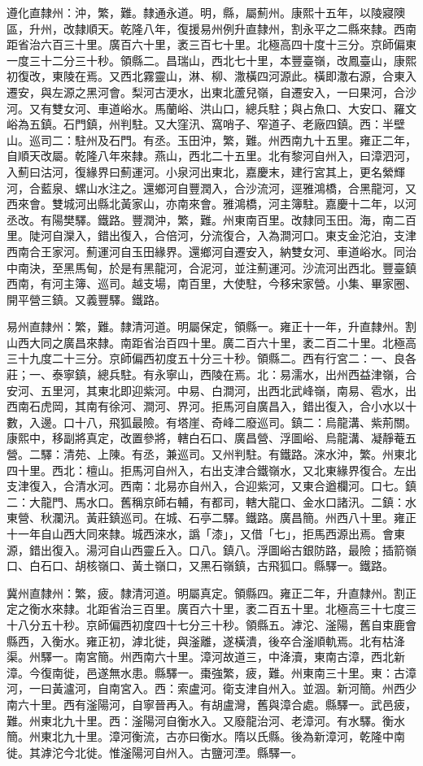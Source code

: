 \begin{pinyinscope}
遵化直隸州：沖，繁，難。隸通永道。明，縣，屬薊州。康熙十五年，以陵寢隩區，升州，改隸順天。乾隆八年，復援易州例升直隸州，割永平之二縣來隸。西南距省治六百三十里。廣百六十里，袤三百七十里。北極高四十度十三分。京師偏東一度三十二分三十秒。領縣二。昌瑞山，西北七十里，本豐臺嶺，改鳳臺山，康熙初復改，東陵在焉。又西北霧靈山，淋、柳、潵橫四河源此。橫即潵右源，合東入遷安，與左源之黑河會。梨河古浭水，出東北蘆兒嶺，自遷安入，一曰果河，合沙河。又有雙女河、車道峪水。馬蘭峪、洪山口，總兵駐；與占魚口、大安口、羅文峪為五鎮。石門鎮，州判駐。又大窪汛、窩哨子、窄道子、老廠四鎮。西：半壁山。巡司二：駐州及石門。有丞。玉田沖，繁，難。州西南九十五里。雍正二年，自順天改屬。乾隆八年來隸。燕山，西北二十五里。北有黎河自州入，曰漳泗河，入薊曰沽河，復緣界曰薊運河。小泉河出東北，嘉慶末，建行宮其上，更名縈輝河，合藍泉、螺山水注之。還鄉河自豐潤入，合沙流河，逕雅鴻橋，合黑龍河，又西來會。雙城河出縣北黃家山，亦南來會。雅鴻橋，河主簿駐。嘉慶十二年，以河丞改。有陽樊驛。鐵路。豐潤沖，繁，難。州東南百里。改隸同玉田。海，南二百里。陡河自灤入，錯出復入，合倍河，分流復合，入為澗河口。東支金沱泊，支津西南合王家河。薊運河自玉田緣界。還鄉河自遷安入，納雙女河、車道峪水。同治中南決，至黑馬甸，於是有黑龍河，合泥河，並注薊運河。沙流河出西北。豐臺鎮西南，有河主簿、巡司。越支場，南百里，大使駐，今移宋家營。小集、畢家圈、開平營三鎮。又義豐驛。鐵路。

易州直隸州：繁，難。隸清河道。明屬保定，領縣一。雍正十一年，升直隸州。割山西大同之廣昌來隸。南距省治百四十里。廣二百六十里，袤二百二十里。北極高三十九度二十三分。京師偏西初度五十分三十秒。領縣二。西有行宮二：一、良各莊；一、泰寧鎮，總兵駐。有永寧山，西陵在焉。北：易濡水，出州西益津嶺，合安河、五里河，其東北即迎紫河。中易、白澗河，出西北武峰嶺，南易、雹水，出西南石虎岡，其南有徐河、澗河、界河。拒馬河自廣昌入，錯出復入，合小水以十數，入邊。口十八，飛狐最險。有塔崖、奇峰二廢巡司。鎮二：烏龍溝、紫荊關。康熙中，移副將真定，改置參將，轄白石口、廣昌營、浮圖峪、烏龍溝、凝靜菴五營。二驛：清苑、上陳。有丞，兼巡司。又州判駐。有鐵路。淶水沖，繁。州東北四十里。西北：檀山。拒馬河自州入，右出支津合鐵嶺水，又北東緣界復合。左出支津復入，合清水河。西南：北易亦自州入，合迎紫河，又東合遒欄河。口七。鎮二：大龍門、馬水口。舊稱京師右輔，有都司，轄大龍口、金水口諸汛。二鎮：水東營、秋瀾汛。黃莊鎮巡司。在城、石亭二驛。鐵路。廣昌簡。州西八十里。雍正十一年自山西大同來隸。城西淶水，譌「漆」，又借「七」，拒馬西源出焉。會東源，錯出復入。湯河自山西靈丘入。口八。鎮八。浮圖峪古銀防路，最險；插箭嶺口、白石口、胡核嶺口、黃土嶺口，又黑石嶺鎮，古飛狐口。縣驛一。鐵路。

冀州直隸州：繁，疲。隸清河道。明屬真定。領縣四。雍正二年，升直隸州。割正定之衡水來隸。北距省治三百里。廣百六十里，袤二百五十里。北極高三十七度三十八分五十秒。京師偏西初度四十七分三十秒。領縣五。滹沱、滏陽，舊自束鹿會縣西，入衡水。雍正初，滹北徙，與滏離，遂橫潰，後卒合滏順軌焉。北有枯洚渠。州驛一。南宮簡。州西南六十里。漳河故道三，中洚瀆，東南古漳，西北新漳。今復南徙，邑遂無水患。縣驛一。棗強繁，疲，難。州東南三十里。東：古漳河，一曰黃瀘河，自南宮入。西：索盧河。衛支津自州入。並涸。新河簡。州西少南六十里。西有滏陽河，自寧晉再入。有胡盧灣，舊與漳合處。縣驛一。武邑疲，難。州東北九十里。西：滏陽河自衡水入。又廢龍治河、老漳河。有水驛。衡水簡。州東北九十里。漳河衡流，古亦曰衡水。隋以氏縣。後為新漳河，乾隆中南徙。其滹沱今北徙。惟滏陽河自州入。古鹽河湮。縣驛一。


\end{pinyinscope}
